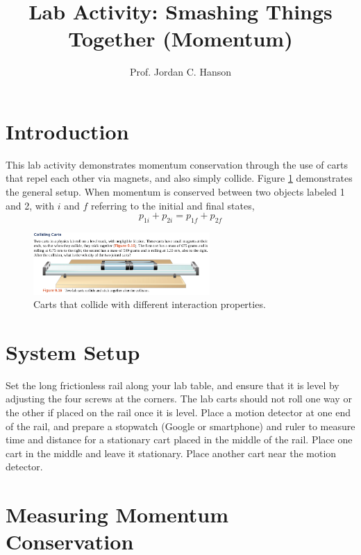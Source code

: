 \documentclass{article}
\begin{document}
\title{Lab Activity: Smashing Things Together (Momentum)}
\author{Prof. Jordan C. Hanson}

\maketitle

\section{Introduction}
This lab activity demonstrates momentum conservation through the use of carts that repel each other via magnets, and also simply collide.  Figure \ref{fig:carts} demonstrates the general setup. When momentum is conserved between two objects labeled 1 and 2, with $i$ and $f$ referring to the initial and final states,
\begin{equation}
p_{1i} + p_{2i} = p_{1f} + p_{2f}
\end{equation}

\begin{figure}[ht]
\centering
\includegraphics[width=0.6\textwidth,trim=0cm 1.2cm 0cm 5cm,clip=true]{figures/carts.png}
\caption{\label{fig:carts} Carts that collide with different interaction properties.}
\end{figure}

\section{System Setup}

Set the long frictionless rail along your lab table, and ensure that it is level by adjusting the four screws at the corners.  The lab carts should not roll one way or the other if placed on the rail once it is level.  Place a motion detector at one end of the rail, and prepare a stopwatch (Google or smartphone) and ruler to measure time and distance for a stationary cart placed in the middle of the rail.  Place one cart in the middle and leave it stationary.  Place another cart near the motion detector.

\section{Measuring Momentum Conservation}
\end{document}
